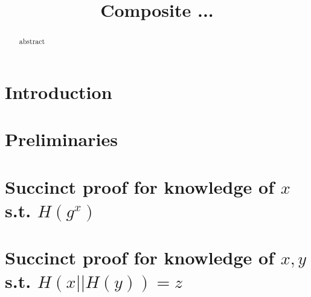 \documentclass{llncs}
\title{Composite ...}
\begin{document}
\maketitle
\begin{abstract} 
 abstract
  \end{abstract} 



\section{Introduction}

%

\section{Preliminaries}\label{sec:prelims}



\section{Succinct proof for knowledge of $x$ s.t. $H(g^x)$}\label{sec:knowledgexKEA}



\section{Succinct proof for knowledge of $x,y$ s.t. $H(x||H(y))=z$}\label{sec:knowledgexyHH}








%
\end{document}
